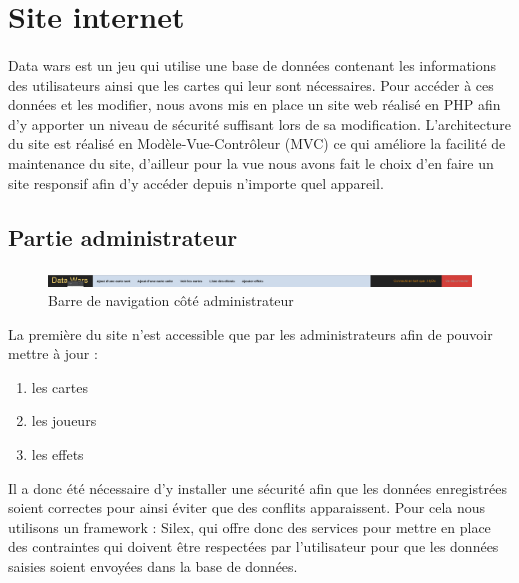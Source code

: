 \documentclass[a4paper,11pt]{report}
\title{}
\author{}
\begin{document}
	\section{Site internet}

	\paragraph{}
       Data wars est un jeu qui utilise une base de données contenant les informations des utilisateurs ainsi que les cartes qui leur sont nécessaires. Pour accéder à ces données et les modifier, nous avons mis en place un site web réalisé en PHP afin d'y apporter un niveau de sécurité suffisant lors de sa modification. L'architecture du site est réalisé en Modèle-Vue-Contrôleur (MVC) ce qui améliore la facilité de maintenance du site, d'ailleur pour la vue nous avons fait le choix d'en faire un site responsif afin d'y accéder depuis n'importe quel appareil. 

	\subsection{Partie administrateur} 
	\paragraph{}

    	\begin{figure}[th]
      	 \begin{center}
          \includegraphics[scale=0.25]{Assets/navbar_admin.png}
          \caption{Barre de navigation côté administrateur}
          \label{RepTravail}
         \end{center}
        \end{figure}

	 La première du site n'est accessible que par les administrateurs afin de pouvoir mettre à jour : 
	\begin{enumerate}
		\item les cartes
		\item les joueurs
		\item les effets
	\end{enumerate}Il a donc été nécessaire d'y installer une sécurité afin que les données enregistrées soient correctes pour ainsi éviter que des conflits apparaissent. Pour cela nous utilisons un framework : Silex, qui offre donc des services pour mettre en place des contraintes qui doivent être respectées par l'utilisateur pour que les données saisies soient envoyées dans la base de données.
\end{document}
